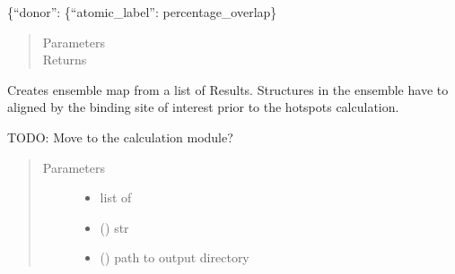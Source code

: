 \documentclass[letterpaper,10pt,english]{sphinxmanual}
\begin{document}
\begin{fulllineitems}
\begin{fulllineitems}
\{“donor”: \{“atomic\_label”: percentage\_overlap\}
\begin{quote}\begin{description}
\item[{Parameters}] \leavevmode
{} \textendash{} 

\item[{Returns}] \leavevmode


\end{description}\end{quote}

\end{fulllineitems}


\begin{fulllineitems}
\label{\detokenize{result_api:hotspots.result.Results.from_grid_ensembles}}

Creates ensemble map from a list of Results. Structures in the ensemble have to aligned by the
binding site of interest prior to the hotspots calculation.

TODO: Move to the calculation module?
\begin{quote}\begin{description}
\item[{Parameters}] \leavevmode\begin{itemize}
\item {} 
 \textendash{} list of 

\item {} 
 () \textendash{} str

\item {} 
 () \textendash{} path to output directory


\end{itemize}
\end{description}
\end{quote}
\end{fulllineitems}
\end{fulllineitems}
\end{document}

